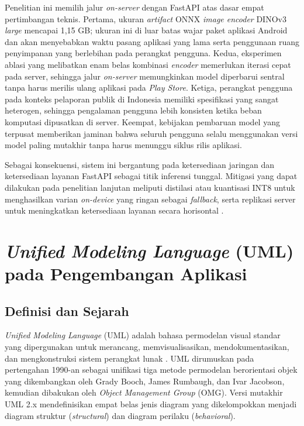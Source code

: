 Penelitian ini memilih jalur \textit{on-server} dengan FastAPI atas dasar empat pertimbangan teknis. Pertama, ukuran \textit{artifact} ONNX \textit{image encoder} DINOv3 \textit{large} mencapai 1,15 GB; ukuran ini di luar batas wajar paket aplikasi Android dan akan menyebabkan waktu pasang aplikasi yang lama serta penggunaan ruang penyimpanan yang berlebihan pada perangkat pengguna. Kedua, eksperimen ablasi yang melibatkan enam belas kombinasi \textit{encoder} memerlukan iterasi cepat pada server, sehingga jalur \textit{on-server} memungkinkan model diperbarui sentral tanpa harus merilis ulang aplikasi pada \textit{Play Store}. Ketiga, perangkat pengguna pada konteks pelaporan publik di Indonesia memiliki spesifikasi yang sangat heterogen, sehingga pengalaman pengguna lebih konsisten ketika beban komputasi dipusatkan di server. Keempat, kebijakan pembaruan model yang terpusat memberikan jaminan bahwa seluruh pengguna selalu menggunakan versi model paling mutakhir tanpa harus menunggu siklus rilis aplikasi.

Sebagai konsekuensi, sistem ini bergantung pada ketersediaan jaringan dan ketersediaan layanan FastAPI sebagai titik inferensi tunggal. Mitigasi yang dapat dilakukan pada penelitian lanjutan meliputi distilasi atau kuantisasi INT8 untuk menghasilkan varian \textit{on-device} yang ringan sebagai \textit{fallback}, serta replikasi server untuk meningkatkan ketersediaan layanan secara horisontal \citep{wangCognitiveEdgeComputing2025}.

\section{\textit{Unified Modeling Language} (UML) pada Pengembangan Aplikasi}
\label{sec:uml}

\subsection{Definisi dan Sejarah}

\textit{Unified Modeling Language} (UML) adalah bahasa permodelan visual standar yang dipergunakan untuk merancang, memvisualisasikan, mendokumentasikan, dan mengkonstruksi sistem perangkat lunak \citep{boochUML2005}. UML dirumuskan pada pertengahan 1990-an sebagai unifikasi tiga metode permodelan berorientasi objek yang dikembangkan oleh Grady Booch, James Rumbaugh, dan Ivar Jacobson, kemudian dibakukan oleh \textit{Object Management Group} (OMG). Versi mutakhir UML 2.x mendefinisikan empat belas jenis diagram yang dikelompokkan menjadi diagram struktur (\textit{structural}) dan diagram perilaku (\textit{behavioral}).

